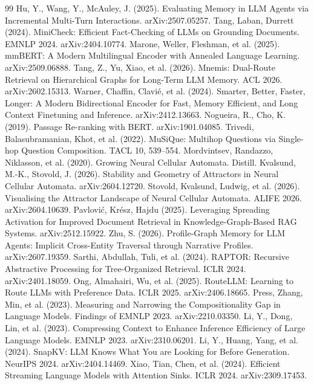 \documentclass[11pt]{article}
\begin{document}
\begin{thebibliography}{99}
 Hu, Y., Wang, Y., McAuley, J. (2025). Evaluating Memory in LLM Agents via Incremental Multi-Turn Interactions. arXiv:2507.05257.
 Tang, Laban, Durrett (2024). MiniCheck: Efficient Fact-Checking of LLMs on Grounding Documents. EMNLP 2024. arXiv:2404.10774.
 Marone, Weller, Fleshman, et al. (2025). mmBERT: A Modern Multilingual Encoder with Annealed Language Learning. arXiv:2509.06888.
 Tang, Z., Yu, Xiao, et al. (2026). Mnemis: Dual-Route Retrieval on Hierarchical Graphs for Long-Term LLM Memory. ACL 2026. arXiv:2602.15313.
 Warner, Chaffin, Clavi{\'{e}}, et al. (2024). Smarter, Better, Faster, Longer: A Modern Bidirectional Encoder for Fast, Memory Efficient, and Long Context Finetuning and Inference. arXiv:2412.13663.
 Nogueira, R., Cho, K. (2019). Passage Re-ranking with BERT. arXiv:1901.04085.
 Trivedi, Balasubramanian, Khot, et al. (2022). MuSiQue: Multihop Questions via Single-hop Question Composition. TACL 10, 539--554.
 Mordvintsev, Randazzo, Niklasson, et al. (2020). Growing Neural Cellular Automata. Distill.
 Kvalsund, M.-K., Stovold, J. (2026). Stability and Geometry of Attractors in Neural Cellular Automata. arXiv:2604.12720.
 Stovold, Kvalsund, Ludwig, et al. (2026). Visualising the Attractor Landscape of Neural Cellular Automata. ALIFE 2026. arXiv:2604.10639.
 Pavlovi{\'{c}}, Kr{\'{e}}sz, Hajdu (2025). Leveraging Spreading Activation for Improved Document Retrieval in Knowledge-Graph-Based RAG Systems. arXiv:2512.15922.
 Zhu, S. (2026). Profile-Graph Memory for LLM Agents: Implicit Cross-Entity Traversal through Narrative Profiles. arXiv:2607.19359.
 Sarthi, Abdullah, Tuli, et al. (2024). RAPTOR: Recursive Abstractive Processing for Tree-Organized Retrieval. ICLR 2024. arXiv:2401.18059.
 Ong, Almahairi, Wu, et al. (2025). RouteLLM: Learning to Route LLMs with Preference Data. ICLR 2025. arXiv:2406.18665.
 Press, Zhang, Min, et al. (2023). Measuring and Narrowing the Compositionality Gap in Language Models. Findings of EMNLP 2023. arXiv:2210.03350.
 Li, Y., Dong, Lin, et al. (2023). Compressing Context to Enhance Inference Efficiency of Large Language Models. EMNLP 2023. arXiv:2310.06201.
 Li, Y., Huang, Yang, et al. (2024). SnapKV: LLM Knows What You are Looking for Before Generation. NeurIPS 2024. arXiv:2404.14469.
 Xiao, Tian, Chen, et al. (2024). Efficient Streaming Language Models with Attention Sinks. ICLR 2024. arXiv:2309.17453.

\end{thebibliography}
\end{document}
